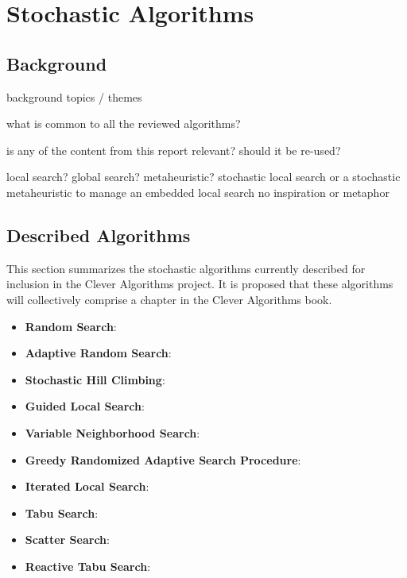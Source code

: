\documentclass[a4paper, 11pt]{article}
\begin{document}
% 
% 
\section{Stochastic Algorithms}
\label{sec:algorithms}

% 
% 
\subsection{Background}
background topics / themes

what is common to all the reviewed algorithms?

is any of the content from this report relevant? should it be re-used? \cite{Brownlee2010n}

local search? global search? metaheuristic?
stochastic local search or a stochastic metaheuristic to manage an embedded local search
no inspiration or metaphor


% 
% 
\subsection{Described Algorithms}
This section summarizes the stochastic algorithms currently described for inclusion in the Clever Algorithms project. It is proposed that these algorithms will collectively comprise a chapter in the Clever Algorithms book. 

\begin{itemize}
	\item \textbf{Random Search}: \cite{Brownlee2010g}
	\item \textbf{Adaptive Random Search}: \cite{Brownlee2010h}
	\item \textbf{Stochastic Hill Climbing}: \cite{Brownlee2010i}
	\item \textbf{Guided Local Search}: \cite{Brownlee2010j}
	\item \textbf{Variable Neighborhood Search}: \cite{Brownlee2010e}
	\item \textbf{Greedy Randomized Adaptive Search Procedure}: \cite{Brownlee2010d}
	\item \textbf{Iterated Local Search}: \cite{Brownlee2010k}
	\item \textbf{Tabu Search}: \cite{Brownlee2010f}
	\item \textbf{Scatter Search}: \cite{Brownlee2010l}
	\item \textbf{Reactive Tabu Search}: \cite{Brownlee2010m}
\end{itemize}
\end{document}
